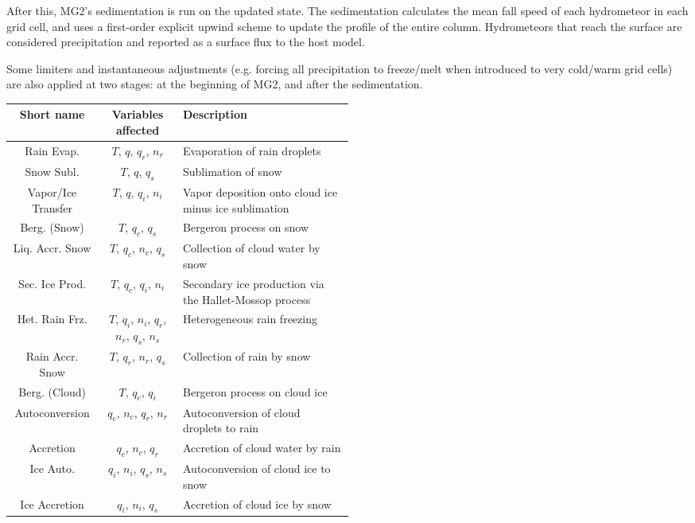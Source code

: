 \documentclass [11pt, proquest] {uwthesis}[2020/02/24]
\begin{document}
After this, MG2's sedimentation is run on the updated state. The sedimentation calculates the mean fall speed of each hydrometeor in each grid cell, and uses a first-order explicit upwind scheme to update the profile of the entire column. Hydrometeors that reach the surface are considered precipitation and reported as a surface flux to the host model.

Some limiters and instantaneous adjustments (e.g. forcing all precipitation to freeze/melt when introduced to very cold/warm grid cells) are also applied at two stages: at the beginning of MG2, and after the sedimentation.

\begin{table}
  \centering
  \begin{tabular}{|c|c|p{0.5\linewidth}|}
    \hline
    Short name & Variables affected & Description \\
    \hline
    Rain Evap. & $T$, $q$, $q_r$, $n_r$ & Evaporation of rain droplets \\
    \hline
    Snow Subl. & $T$, $q$, $q_s$ & Sublimation of snow \\
    \hline
    Vapor/Ice Transfer & $T$, $q$, $q_i$, $n_i$
        & Vapor deposition onto cloud ice minus ice sublimation \\
    \hline
    Berg. (Snow) & $T$, $q_c$, $q_s$ & Bergeron process on snow \\
    \hline
    Liq. Accr. Snow & $T$, $q_c$, $n_c$, $q_s$
        & Collection of cloud water by snow \\
    \hline
    Sec. Ice Prod. & $T$, $q_c$, $q_i$, $n_i$
        & Secondary ice production via the Hallet-Mossop process \\
    \hline
    Het. Rain Frz. & $T$, $q_i$, $n_i$, $q_r$, $n_r$, $q_s$, $n_s$
        & Heterogeneous rain freezing \\
    \hline
    Rain Accr. Snow & $T$, $q_r$, $n_r$, $q_s$ & Collection of rain by snow \\
    \hline
    Berg. (Cloud) & $T$, $q_c$, $q_i$ & Bergeron process on cloud ice \\
    \hline
    Autoconversion & $q_c$, $n_c$, $q_r$, $n_r$
        & Autoconversion of cloud droplets to rain \\
    \hline
    Accretion & $q_c$, $n_c$, $q_r$ & Accretion of cloud water by rain \\
    \hline
    Ice Auto. & $q_i$, $n_i$, $q_s$, $n_s$
        & Autoconversion of cloud ice to snow \\
    \hline
    Ice Accretion & $q_i$, $n_i$, $q_s$ & Accretion of cloud ice by snow \\

\end{tabular}
\end{table}
\end{document}
